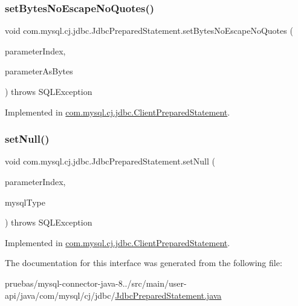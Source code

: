 \subsubsection{\texorpdfstring{set\+Bytes\+No\+Escape\+No\+Quotes()}{setBytesNoEscapeNoQuotes()}}
{\footnotesize\ttfamily void com.\+mysql.\+cj.\+jdbc.\+Jdbc\+Prepared\+Statement.\+set\+Bytes\+No\+Escape\+No\+Quotes (\begin{DoxyParamCaption}\item[{int}]{parameter\+Index,  }\item[{byte \mbox{[}$\,$\mbox{]}}]{parameter\+As\+Bytes }\end{DoxyParamCaption}) throws S\+Q\+L\+Exception}



Implemented in \mbox{\hyperlink{classcom_1_1mysql_1_1cj_1_1jdbc_1_1_client_prepared_statement_a268b6e65cc67b813b8a4348498f3861b}{com.\+mysql.\+cj.\+jdbc.\+Client\+Prepared\+Statement}}.

\mbox{\label{interfacecom_1_1mysql_1_1cj_1_1jdbc_1_1_jdbc_prepared_statement_a3a6d8662a3372f19ead94698c2cf3ed1}} 
\subsubsection{\texorpdfstring{set\+Null()}{setNull()}}
{\footnotesize\ttfamily void com.\+mysql.\+cj.\+jdbc.\+Jdbc\+Prepared\+Statement.\+set\+Null (\begin{DoxyParamCaption}\item[{int}]{parameter\+Index,  }\item[{\mbox{\hyperlink{enumcom_1_1mysql_1_1cj_1_1_mysql_type}{Mysql\+Type}}}]{mysql\+Type }\end{DoxyParamCaption}) throws S\+Q\+L\+Exception}



Implemented in \mbox{\hyperlink{classcom_1_1mysql_1_1cj_1_1jdbc_1_1_client_prepared_statement_aa53b4fe84756e62cb190a9218a8ec95b}{com.\+mysql.\+cj.\+jdbc.\+Client\+Prepared\+Statement}}.



The documentation for this interface was generated from the following file\+:\begin{DoxyCompactItemize}
\item 
pruebas/mysql-\/connector-\/java-\/8../src/main/user-\/api/java/com/mysql/cj/jdbc/\mbox{\hyperlink{_jdbc_prepared_statement_8java}{Jdbc\+Prepared\+Statement.\+java}}\end{DoxyCompactItemize}
